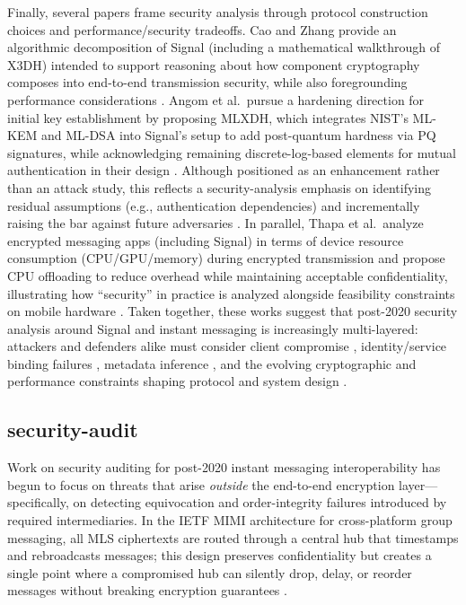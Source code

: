Finally, several papers frame security analysis through protocol construction choices and performance/security tradeoffs. Cao and Zhang provide an algorithmic decomposition of Signal (including a mathematical walkthrough of X3DH) intended to support reasoning about how component cryptography composes into end-to-end transmission security, while also foregrounding performance considerations \cite{cao2022}. Angom et al.\ pursue a hardening direction for initial key establishment by proposing MLXDH, which integrates NIST’s ML-KEM and ML-DSA into Signal’s setup to add post-quantum hardness via PQ signatures, while acknowledging remaining discrete-log-based elements for mutual authentication in their design \cite{angom2025}. Although positioned as an enhancement rather than an attack study, this reflects a security-analysis emphasis on identifying residual assumptions (e.g., authentication dependencies) and incrementally raising the bar against future adversaries \cite{angom2025}. In parallel, Thapa et al.\ analyze encrypted messaging apps (including Signal) in terms of device resource consumption (CPU/GPU/memory) during encrypted transmission and propose CPU offloading to reduce overhead while maintaining acceptable confidentiality, illustrating how “security” in practice is analyzed alongside feasibility constraints on mobile hardware \cite{thapa2025}. Taken together, these works suggest that post-2020 security analysis around Signal and instant messaging is increasingly multi-layered: attackers and defenders alike must consider client compromise \cite{jain2021}, identity/service binding failures \cite{zhao2022}, metadata inference \cite{brigham2025}, and the evolving cryptographic and performance constraints shaping protocol and system design \cite{cao2022,angom2025,thapa2025}.

\subsection{security-audit}
Work on security auditing for post-2020 instant messaging interoperability has begun to focus on threats that arise \emph{outside} the end-to-end encryption layer—specifically, on detecting equivocation and order-integrity failures introduced by required intermediaries. In the IETF MIMI architecture for cross-platform group messaging, all MLS ciphertexts are routed through a central hub that timestamps and rebroadcasts messages; this design preserves confidentiality but creates a single point where a compromised hub can silently drop, delay, or reorder messages without breaking encryption guarantees \cite{sarvaiya2025}. 

